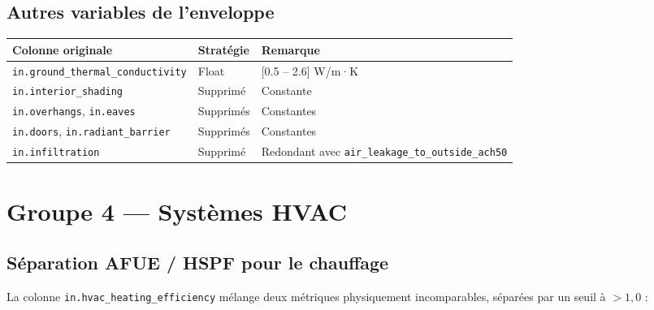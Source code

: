 \documentclass[11pt,a4paper]{article}
\begin{document}
\subsection{Autres variables de l'enveloppe}

\begin{longtable}{L{5.2cm}L{3cm}L{5.8cm}}
\toprule
\textbf{Colonne originale} & \textbf{Stratégie} & \textbf{Remarque} \\
\midrule
\endhead
{}
\texttt{in.ground\_thermal\_conductivity} & Float & [0.5 – 2.6] W/m·K \\
\texttt{in.interior\_shading} & Supprimé & Constante \\
\texttt{in.overhangs}, \texttt{in.eaves} & Supprimés & Constantes \\
\texttt{in.doors}, \texttt{in.radiant\_barrier} & Supprimés & Constantes \\
\texttt{in.infiltration} & Supprimé & Redondant avec \texttt{air\_leakage\_to\_outside\_ach50} \\
\bottomrule
\end{longtable}

\section{Groupe 4 — Systèmes HVAC}

\subsection{Séparation AFUE / HSPF pour le chauffage}

La colonne \texttt{in.hvac\_heating\_efficiency} mélange deux métriques
physiquement incomparables, séparées par un seuil à $> 1{,}0$ :
\end{document}
